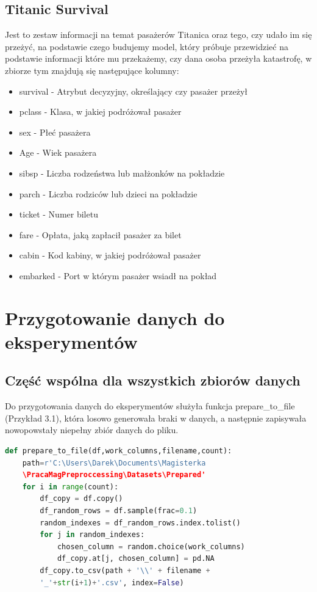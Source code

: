 \documentclass{book}
\begin{document}
\subsection{Titanic Survival}
Jest to zestaw informacji na temat pasażerów Titanica oraz tego, 
czy udało im się przeżyć, na podstawie czego budujemy model, 
który próbuje przewidzieć na podstawie informacji które mu przekażemy, 
czy dana osoba przeżyła katastrofę, w zbiorze tym znajdują się
następujące kolumny:
\begin{itemize}
    \item survival - Atrybut decyzyjny, określający czy pasażer przeżył
    \item pclass - Klasa, w jakiej podróżował pasażer
    \item sex - Płeć pasażera
    \item Age - Wiek pasażera
    \item sibsp - Liczba rodzeństwa lub małżonków na pokładzie
    \item parch - Liczba rodziców lub dzieci na pokładzie
    \item ticket - Numer biletu
    \item fare - Opłata, jaką zapłacił pasażer za bilet
    \item cabin - Kod kabiny, w jakiej podróżował pasażer
    \item embarked - Port w którym pasażer wsiadł na pokład
\end{itemize}

\section{Przygotowanie danych do eksperymentów}
\subsection{Część wspólna dla wszystkich zbiorów danych}
Do przygotowania danych do eksperymentów służyła 
funkcja prepare\_to\_file (Przykład 3.1), która losowo generowała braki w danych, a następnie 
zapisywała nowopowstały niepełny zbiór danych do pliku.

\begin{lstlisting}[language=Python, caption={Funkcja generująca braki w podanym zbiorze danych}, captionpos=b]
    def prepare_to_file(df,work_columns,filename,count):
    path=r'C:\Users\Darek\Documents\Magisterka
    \PracaMagPreproccessing\Datasets\Prepared'
    for i in range(count):
        df_copy = df.copy()
        df_random_rows = df.sample(frac=0.1)
        random_indexes = df_random_rows.index.tolist()
        for j in random_indexes:
            chosen_column = random.choice(work_columns)
            df_copy.at[j, chosen_column] = pd.NA
        df_copy.to_csv(path + '\\' + filename +
        '_'+str(i+1)+'.csv', index=False)
\end{lstlisting}
\end{document}
